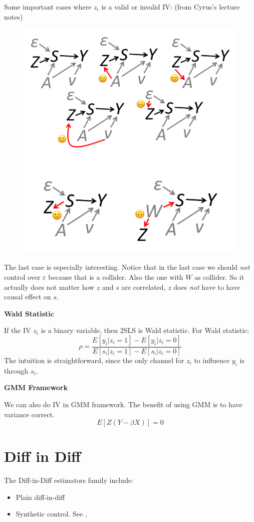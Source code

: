 Some important cases where $z_i$ is a valid or invalid IV: (from Cyrus's lecture notes)
\begin{figure}[h]
    \centering
    \includegraphics[width=0.5\linewidth]{images/iv-direct-graph.png}
    \includegraphics[width=0.5\linewidth]{images/iv-direct-figure2.png}
\end{figure}
The last case is especially interesting.
Notice that in the last case we should \textit{not} control over $\varepsilon$ because that is a collider. Also the one with $W$ as collider.
So it actually does not matter how $z$ and $s$ are correlated, $z$ does \textit{not} have to have causal effect on $s$. 


\textbf{Wald Statistic}

If the IV $z_i$ is a binary variable, then 2SLS is Wald statistic.
For Wald statistic:
\[
    \rho = \frac{E[y_i | z_i =1] - E[y_i | z_i=0]}
    {E[s_i | z_i =1] - E[s_i|z_i=0]}
\]
The intuition is straightforward,
since the only channel for $z_i$ to influence $y_i$ is through $s_i$.


\textbf{GMM Framework}

We can also do IV in GMM framework.
The benefit of using GMM is to have variance correct.
\[
    E [Z(Y - \beta X)] = 0
\]


\chapter{Diff in Diff} %
\label{cha:diff_in_diff}

The Diff-in-Diff estimators family include:
\begin{itemize}
    \item Plain diff-in-diff
    \item Synthetic control. See \citet{AbadieDiamondHainmueller2010}, \citet{Xu2017}
\end{itemize}


